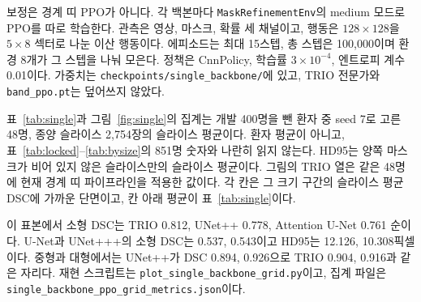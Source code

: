 \documentclass[runningheads]{llncs}
\begin{document}
보정은 경계 띠 PPO가 아니다. 각 백본마다 \texttt{MaskRefinementEnv}의 medium 모드로 PPO를 따로 학습한다. 관측은 영상, 마스크, 확률 세 채널이고, 행동은 $128\times128$을 $5\times8$ 섹터로 나눈 이산 행동이다. 에피소드는 최대 15스텝, 총 스텝은 100{,}000이며 환경 8개가 그 스텝을 나눠 모은다. 정책은 CnnPolicy, 학습률 $3\times10^{-4}$, 엔트로피 계수 0.01이다. 가중치는 \texttt{checkpoints/single\_backbone/}에 있고, TRIO 전문가와 \texttt{band\_ppo.pt}는 덮어쓰지 않았다.

표~\ref{tab:single}과 그림~\ref{fig:single}의 집계는 개발 400명을 뺀 환자 중 seed 7로 고른 48명, 종양 슬라이스 2{,}754장의 슬라이스 평균이다. 환자 평균이 아니고, 표~\ref{tab:locked}--\ref{tab:bysize}의 851명 숫자와 나란히 읽지 않는다. HD95는 양쪽 마스크가 비어 있지 않은 슬라이스만의 슬라이스 평균이다. 그림의 TRIO 열은 같은 48명에 현재 경계 띠 파이프라인을 적용한 값이다. 각 칸은 그 크기 구간의 슬라이스 평균 DSC에 가까운 단면이고, 칸 아래 평균이 표~\ref{tab:single}이다.

\begin{table}[t]
\caption{미사용 48명 표본의 슬라이스 평균. 851명 환자 평균이 아니다.}
\label{tab:single}
\centering
\footnotesize
\setlength{\tabcolsep}{3pt}
\end{table}

이 표본에서 소형 DSC는 TRIO 0.812, UNet++ 0.778, Attention U-Net 0.761 순이다. U-Net과 UNet+++의 소형 DSC는 0.537, 0.543이고 HD95는 12.126, 10.308픽셀이다. 중형과 대형에서는 UNet++가 DSC 0.894, 0.926으로 TRIO 0.904, 0.916과 같은 자리다. 재현 스크립트는 \texttt{plot\_single\_backbone\_grid.py}이고, 집계 파일은 \texttt{single\_backbone\_ppo\_grid\_metrics.json}이다.
\end{document}

